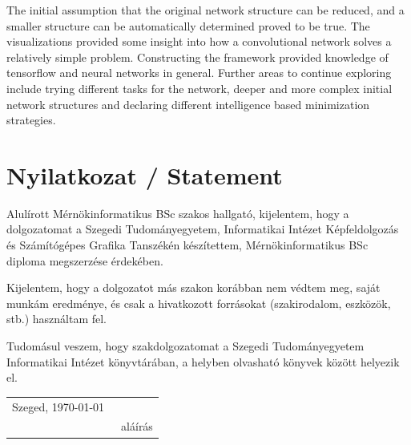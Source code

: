 \documentclass[12pt]{report}
\begin{document}
The initial assumption that the original network structure can be reduced, and a smaller structure can be automatically determined proved to be true. The visualizations provided some insight into how a convolutional network solves a relatively simple problem. Constructing the framework provided knowledge of tensorflow and neural networks in general. Further areas to continue exploring include trying different tasks for the network, deeper and more complex initial network structures and declaring different intelligence based minimization strategies.

\chapter*{Nyilatkozat / Statement}
\hspace{\parindent}



\noindent
Alulírott Mérnökinformatikus BSc szakos hallgató, kijelentem, hogy a dolgozatomat a Szegedi Tudományegyetem, Informatikai Intézet Képfeldolgozás és Számítógépes Grafika Tanszékén készítettem, Mérnökinformatikus BSc diploma megszerzése érdekében.

Kijelentem, hogy a dolgozatot más szakon korábban nem védtem meg, saját munkám eredménye, és csak a hivatkozott forrásokat (szakirodalom, eszközök, stb.) használtam fel.

Tudomásul veszem, hogy szakdolgozatomat a Szegedi Tudományegyetem Informatikai Intézet könyvtárában, a helyben olvasható könyvek között helyezik el.

\vspace*{2cm}

\begin{tabular}{lc}
	Szeged, \today\
	\hspace{2cm} & \makebox[6cm]{\dotfill} \\
	& aláírás \\
\end{tabular}
\end{document}
